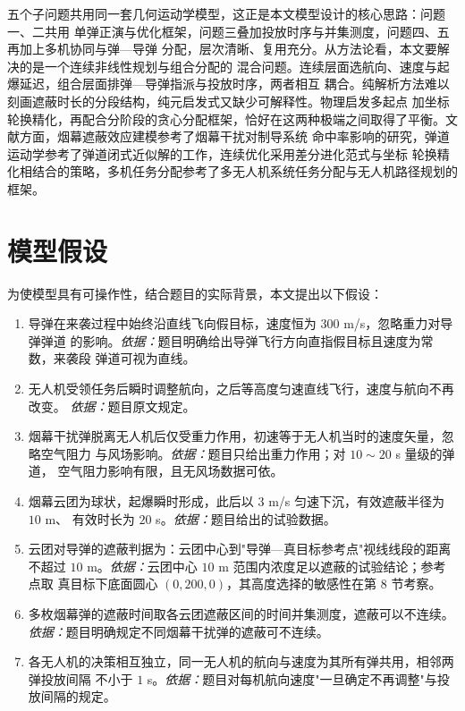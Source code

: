 \documentclass[12pt, a4paper]{article}
\begin{document}
五个子问题共用同一套几何运动学模型，这正是本文模型设计的核心思路：问题一、二共用
单弹正演与优化框架，问题三叠加投放时序与并集测度，问题四、五再加上多机协同与弹—导弹
分配，层次清晰、复用充分。从方法论看，本文要解决的是一个连续非线性规划与组合分配的
混合问题。连续层面选航向、速度与起爆延迟，组合层面排弹—导弹指派与投放时序，两者相互
耦合。纯解析方法难以刻画遮蔽时长的分段结构，纯元启发式又缺少可解释性。物理启发多起点
加坐标轮换精化，再配合分阶段的贪心分配框架，恰好在这两种极端之间取得了平衡。文献方面，烟幕遮蔽效应建模参考了烟幕干扰对制导系统
命中率影响的研究，弹道运动学参考了弹道闭式近似解的工作，连续优化采用差分进化范式与坐标
轮换精化相结合的策略，多机任务分配参考了多无人机系统任务分配与无人机路径规划的框架。

\section{模型假设}

为使模型具有可操作性，结合题目的实际背景，本文提出以下假设：

\begin{enumerate}[label=\textbf{假设\arabic*：}, leftmargin=*]
    \item 导弹在来袭过程中始终沿直线飞向假目标，速度恒为 $300$ m/s，忽略重力对导弹弹道
          的影响。\textit{依据：}题目明确给出导弹飞行方向直指假目标且速度为常数，来袭段
          弹道可视为直线。
    \item 无人机受领任务后瞬时调整航向，之后等高度匀速直线飞行，速度与航向不再改变。
          \textit{依据：}题目原文规定。
    \item 烟幕干扰弹脱离无人机后仅受重力作用，初速等于无人机当时的速度矢量，忽略空气阻力
          与风场影响。\textit{依据：}题目只给出重力作用；对 $10\sim 20$ s 量级的弹道，
          空气阻力影响有限，且无风场数据可依。
    \item 烟幕云团为球状，起爆瞬时形成，此后以 $3$ m/s 匀速下沉，有效遮蔽半径为 $10$ m、
          有效时长为 $20$ s。\textit{依据：}题目给出的试验数据。
    \item 云团对导弹的遮蔽判据为：云团中心到"导弹—真目标参考点"视线线段的距离不超过
          $10$ m。\textit{依据：}云团中心 $10$ m 范围内浓度足以遮蔽的试验结论；参考点取
          真目标下底面圆心 $(0,200,0)$，其高度选择的敏感性在第 8 节考察。
    \item 多枚烟幕弹的遮蔽时间取各云团遮蔽区间的时间并集测度，遮蔽可以不连续。
          \textit{依据：}题目明确规定不同烟幕干扰弹的遮蔽可不连续。
    \item 各无人机的决策相互独立，同一无人机的航向与速度为其所有弹共用，相邻两弹投放间隔
          不小于 $1$ s。\textit{依据：}题目对每机航向速度"一旦确定不再调整"与投放间隔的规定。
\end{enumerate}
\end{document}
